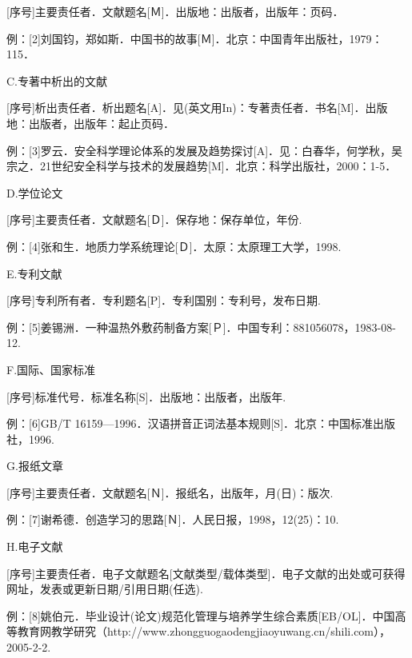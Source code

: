 	[序号]主要责任者．文献题名[Ｍ]．出版地：出版者，出版年：页码．

	例：[2]刘国钧，郑如斯．中国书的故事[Ｍ]．北京：中国青年出版社，1979：115．

\noindent C.专著中析出的文献

	[序号]析出责任者．析出题名[A]．见(英文用In)：专著责任者．书名[M]．出版地：出版者，出版年：起止页码．

	例：[3]罗云．安全科学理论体系的发展及趋势探讨[A]．见：白春华，何学秋，吴宗之．21世纪安全科学与技术的发展趋势[M]．北京：科学出版社，2000：1-5．

\noindent D.学位论文

	[序号]主要责任者．文献题名[Ｄ]．保存地：保存单位，年份.

	例：[4]张和生．地质力学系统理论[Ｄ]．太原：太原理工大学，1998.

\noindent E.专利文献

	[序号]专利所有者．专利题名[P]．专利国别：专利号，发布日期.

	例：[5]姜锡洲．一种温热外敷药制备方案[Ｐ]．中国专利：881056078，1983-08-12.

\noindent F.国际、国家标准

	[序号]标准代号．标准名称[S]．出版地：出版者，出版年.
	
	例：[6]GB/T 16159—1996．汉语拼音正词法基本规则[S]．北京：中国标准出版社，1996.

\noindent G.报纸文章

	[序号]主要责任者．文献题名[Ｎ]．报纸名，出版年，月(日)：版次.

	例：[7]谢希德．创造学习的思路[Ｎ]．人民日报，1998，12(25)：10.

\noindent H.电子文献

	[序号]主要责任者．电子文献题名[文献类型/载体类型]．电子文献的出处或可获得网址，发表或更新日期/引用日期(任选).
	
	例：[8]姚伯元．毕业设计(论文)规范化管理与培养学生综合素质[EB/OL]．中国高等教育网教学研究（http://www.zhongguogaodengjiaoyuwang.cn/shili.com），2005-2-2.






	